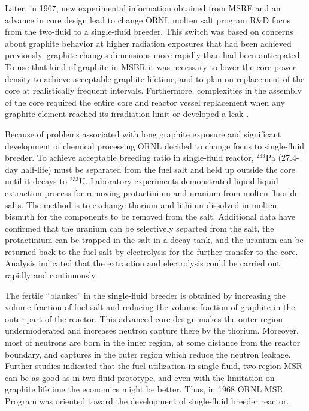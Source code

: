 Later, in 1967, new experimental information obtained from \gls{MSRE} and an advance in core design lead to change \gls{ORNL} molten salt program R\&D focus from the two-fluid to a single-fluid breeder. This switch was based on concerns about graphite behavior at higher radiation exposures that had been achieved previously, graphite changes dimensions more rapidly than had been anticipated. To use that kind of graphite in \gls{MSBR} it was necessary to lower the core power density to achieve acceptable graphite lifetime, and to plan on replacement of the core at realistically frequent intervals. Furthermore, complexities in the assembly of the core required the entire core and reactor vessel replacement when any graphite element reached its irradiation limit or developed a leak \cite{rosenthal_molten-salt_1970}.

Because of problems associated with long graphite exposure and significant development of chemical processing \gls{ORNL} decided to change focus to single-fluid breeder. To achieve acceptable breeding ratio in single-fluid reactor, $^{233}$Pa (27.4-day half-life) must be separated from the fuel salt and held up outside the core until it decays to $^{233}$U. Laboratory experiments demonstrated liquid-liquid extraction process for removing protactinium and uranium from molten fluoride salts. The method is to exchange thorium and lithium dissolved in molten bismuth for the components to be removed from the salt. Additional data have confirmed that the uranium can be selectively separted from the salt, the protactinium can be trapped in the salt in a decay tank, and the uranium can be returned back to the fuel salt by electrolysis for the further transfer to the core. Analysis indicated that the extraction and electrolysis could be carried out rapidly and continuously.

The fertile ``blanket'' in the single-fluid breeder is obtained by increasing the volume fraction of fuel salt and reducing the volume fraction of graphite in the outer part of the reactor. This advanced core design makes the outer region undermoderated and increases neutron capture there by the thorium. Moreover, most of neutrons are born in the inner region, at some distance from the reactor boundary, and captures in the outer region which reduce the neutron leakage. Further studies indicated that the fuel utilization in single-fluid, two-region \gls{MSR} can be as good as in two-fluid prototype, and even with the limitation on graphite lifetime the economics might be better. Thus, in 1968 \gls{ORNL} \gls{MSR} Program was oriented toward the development of single-fluid breeder reactor.


